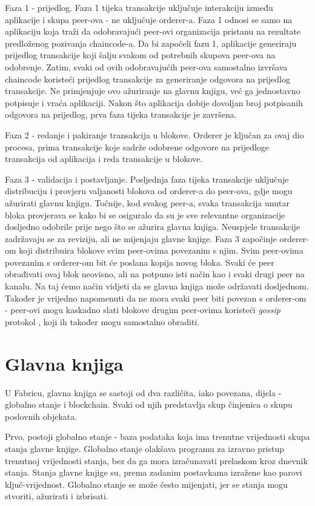 \documentclass[times, utf8, diplomski]{fer}
\begin{document}
Faza 1 - prijedlog.  Faza 1 tijeka transakcije uključuje interakciju između aplikacije i skupa peer-ova - ne uključuje orderer-a. Faza 1 odnosi se samo na aplikaciju koja traži da odobravajući peer-ovi organizacija pristanu na rezultate predloženog pozivanja chaincode-a. Da bi započeli fazu 1, aplikacije generiraju prijedlog transakcije koji šalju svakom od potrebnih skupova peer-ova na odobrenje. Zatim, svaki od ovih odobravajućih peer-ova samostalno izvršava chaincode koristeći prijedlog transakcije za generiranje odgovora na prijedlog transakcije. Ne primjenjuje ovo ažuriranje na glavnu knjigu, već ga jednostavno potpisuje i vraća aplikaciji. Nakon što aplikacija dobije dovoljan broj potpisanih odgovora na prijedlog, prva faza tijeka transakcije je završena.

Faza 2 - redanje i pakiranje transakcija u blokove. Orderer je ključan za ovaj dio procesa, prima transakcije koje sadrže odobrene odgovore na prijedloge transakcija od aplikacija i reda transakcije u blokove.

Faza 3 - validacija i postavljanje.  Posljednja faza tijeka transakcije uključuje distribuciju i provjeru valjanosti blokova od orderer-a do peer-ova, gdje mogu ažurirati glavnu knjigu. Točnije, kod svakog peer-a, svaka transakcija unutar bloka provjerava se kako bi se osiguralo da su je sve relevantne organizacije dosljedno odobrile prije nego što se ažurira glavna knjiga.  Neuspjele transakcije zadržavaju se za reviziju, ali ne mijenjaju glavne knjige.  Faza 3 započinje orderer-om koji distribuira blokove svim peer-ovima povezanim s njim.  Svim peer-ovima povezanim s orderer-om bit će poslana kopija novog bloka. Svaki će peer obrađivati ovaj blok neovisno, ali na potpuno isti način kao i svaki drugi peer na kanalu. Na taj ćemo način vidjeti da se glavna knjiga može održavati dosljednom. Također je vrijedno napomenuti da ne mora svaki peer biti povezan s orderer-om - peer-ovi mogu kaskadno slati blokove drugim peer-ovima koristeći \textit{gossip} protokol \cite{DBLP:journals/corr/abs-2004-07060},  koji ih također mogu samostalno obraditi.

\section{Glavna knjiga}
U Fabricu, glavna knjiga se sastoji od dva različita, iako povezana, dijela - globalno stanje i blockchain. Svaki od njih predstavlja skup činjenica o skupu poslovnih objekata. \cite{Fabric}

Prvo, postoji globalno stanje - baza podataka koja ima trenutne vrijednosti skupa stanja glavne knjige. Globalno stanje olakšava programu za izravno pristup trenutnoj vrijednosti stanja,  bez da ga mora izračunavati prelaskom kroz dnevnik stanja.  Stanja glavne knjige su, prema zadanim postavkama izražene kao parovi ključ-vrijednost. Globalno stanje se može često mijenjati, jer se stanja mogu stvoriti, ažurirati i izbrisati.
\end{document}
